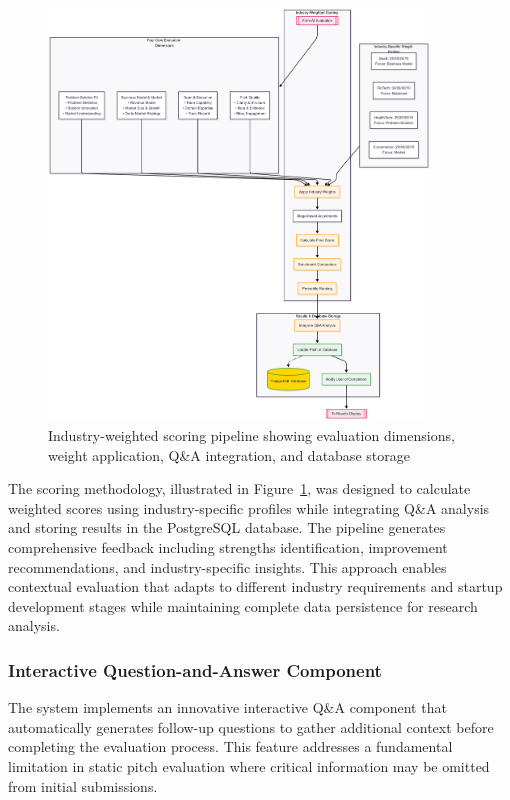 \begin{figure}[H]
  \centering
  \includegraphics[width=0.9\textwidth]{img/eval-flow-part2}
  \caption{Industry-weighted scoring pipeline showing evaluation dimensions, weight application, Q\&A integration, and database storage}
  \label{fig:eval-flow-part2}
\end{figure}

The scoring methodology, illustrated in Figure~\ref{fig:eval-flow-part2}, was designed to calculate weighted scores using industry-specific profiles while integrating Q\&A analysis and storing results in the PostgreSQL database. The pipeline generates comprehensive feedback including strengths identification, improvement recommendations, and industry-specific insights. This approach enables contextual evaluation that adapts to different industry requirements and startup development stages while maintaining complete data persistence for research analysis.

\subsubsection{Interactive Question-and-Answer Component}
The system implements an innovative interactive Q\&A component that automatically generates follow-up questions to gather additional context before completing the evaluation process. This feature addresses a fundamental limitation in static pitch evaluation where critical information may be omitted from initial submissions.

